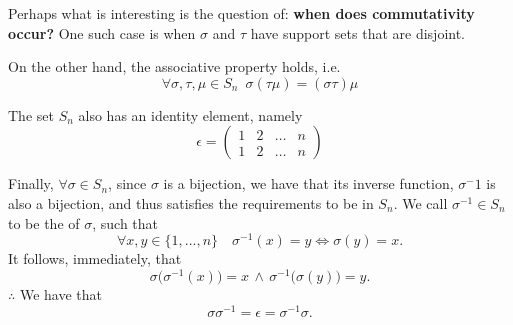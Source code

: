 \documentclass[notoc,notitlepage]{tufte-book}
\begin{document}
Perhaps what is interesting is the question of: \textbf{when does commutativity occur?} One such case is when $\sigma$ and $\tau$ have support sets that are disjoint.

On the other hand, the associative property holds, i.e.
\begin{equation*}
  \forall \sigma, \tau, \mu \in S_n \enspace \sigma (\tau \mu) = (\sigma \tau) \mu
\end{equation*}

The set $S_n$ also has an identity element, namely
\begin{equation*}
  \epsilon = \begin{pmatrix}
    1 & 2 & \hdots & n \\
    1 & 2 & \hdots & n
  \end{pmatrix}
\end{equation*}

Finally, $\forall \sigma \in S_n$, since $\sigma$ is a bijection, we have that its inverse function, $\sigma^-1$ is also a bijection, and thus satisfies the requirements to be in $S_n$. We call $\sigma^{-1} \in S_n$ to be the  of $\sigma$, such that
\begin{equation*}
  \forall x, y \in \{1, ..., n\} \quad \sigma^{-1}(x) = y \iff \sigma(y) = x.
\end{equation*}
It follows, immediately, that
\begin{equation*}
  \sigma \big( \sigma^{-1}(x) \big) = x \, \land \, \sigma^{-1} \big( \sigma(y) \big) = y.
\end{equation*}
$\therefore$ We have that 
\begin{equation*}
  \sigma \sigma^{-1} = \epsilon = \sigma^{-1} \sigma.
\end{equation*}
\end{document}
